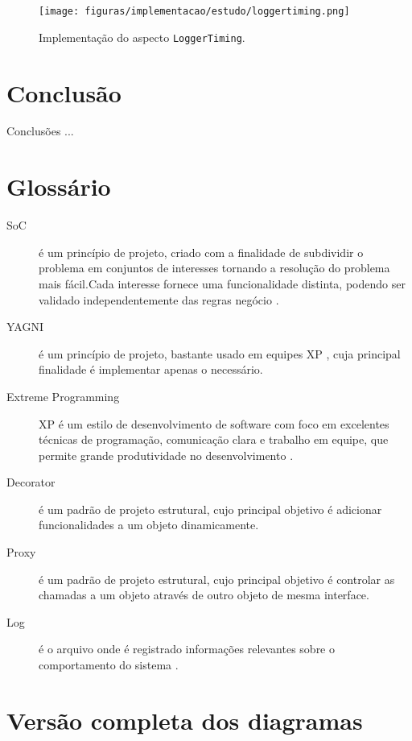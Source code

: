 \documentclass[tc,oneside]{iiufrgs}
\begin{document}
\begin{figure}[ht]
	\centering
	\texttt{[image: figuras/implementacao/estudo/loggertiming.png]}
	\caption{Implementação do aspecto \texttt{LoggerTiming}.}
	\label{fig:loggeraspect}
\end{figure}



\chapter{Conclusão}

Conclusões ...

\singlespacing



\chapter*{Glossário}

\begin{description}
	\item[SoC] é um princípio de projeto, criado com a finalidade de subdividir o problema em conjuntos de interesses tornando a resolução do problema mais fácil.Cada interesse fornece uma funcionalidade distinta, podendo ser validado independentemente das regras negócio \cite{pressman2010engineering}.
	\item [YAGNI] é um princípio de projeto, bastante usado em equipes XP , cuja principal finalidade é implementar apenas o necessário.
	\item[Extreme Programming] XP é um estilo de desenvolvimento de software com foco em excelentes técnicas de programação, comunicação clara e trabalho em equipe, que permite grande produtividade no desenvolvimento \cite{beck2004extreme}.
\item [Decorator] é um padrão de projeto estrutural, cujo principal objetivo é adicionar funcionalidades a um objeto dinamicamente.
\item [Proxy] é um padrão de projeto estrutural, cujo principal objetivo é controlar as chamadas a um objeto através de outro objeto de mesma interface.
\item [Log] é o arquivo onde é registrado informações relevantes sobre o comportamento do sistema \cite{log}.
\end{description}

\appendix

\chapter{Versão completa dos diagramas}
\label{apend:A}
\end{document}
